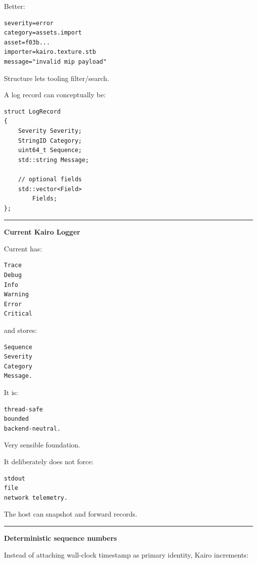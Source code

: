 Better:

\begin{verbatim}
severity=error
category=assets.import
asset=f03b...
importer=kairo.texture.stb
message="invalid mip payload"
\end{verbatim}

Structure lets tooling filter/search.

A log record can conceptually be:

\begin{verbatim}
struct LogRecord
{
    Severity Severity;
    StringID Category;
    uint64_t Sequence;
    std::string Message;

    // optional fields
    std::vector<Field>
        Fields;
};
\end{verbatim}

\begin{center}\rule{0.5\linewidth}{0.5pt}\end{center}

\textbf{Current Kairo Logger}

Current  has:

\begin{verbatim}
Trace
Debug
Info
Warning
Error
Critical
\end{verbatim}

and stores:

\begin{verbatim}
Sequence
Severity
Category
Message.
\end{verbatim}

It is:

\begin{verbatim}
thread-safe
bounded
backend-neutral.
\end{verbatim}

Very sensible foundation.

It deliberately does not force:

\begin{verbatim}
stdout
file
network telemetry.
\end{verbatim}

The host can snapshot and forward records.

\begin{center}\rule{0.5\linewidth}{0.5pt}\end{center}

\textbf{Deterministic sequence numbers}

Instead of attaching wall-clock timestamp as primary identity, Kairo increments:

